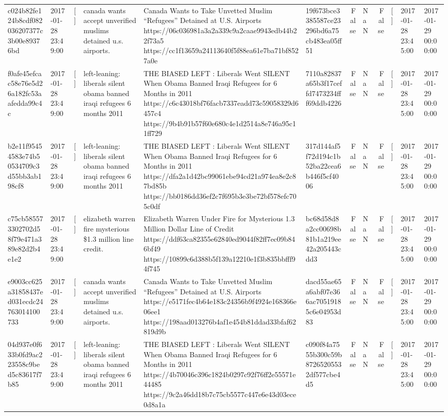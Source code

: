 \begin{tabular}{llllllrlrlll}
c024b82fe124b8cdf082036207377c3b00e89376bd & 2017-01-28 23:49:00 & [] & canada wants accept unverified muslims detained u.s. airports. & Canada Wants to Take Unvetted Muslim “Refugees” Detained at U.S. Airports https://06c036981a3a2a339c9a2caae9943edb44b22f73a5 https://cc1f13659a24113640f5f88ea61e7ba71bf8527a0e & 19f673bce3385587ce23296bd6a75cb483ea05ff51 & False & NaN & False & [] & 2017-01-28 23:45:00 & 2017-01-29 00:00:00 \\
f0afe45efcac58e76e5d26a182fc53aafedda99c4c & 2017-01-28 23:49:00 & [] & left-leaning: liberals silent obama banned iraqi refugees 6 months 2011 & THE BIASED LEFT : Liberals Went SILENT When Obama Banned Iraqi Refugees for 6 Months in 2011 https://c6c43018bf76facb7337eadd73c59058329d6457c4 https://9b4b91b57f60e680c4e1d2514a8e746a95c11ff729 & 7110a82837a65b3f17ceffd7473234fff69ddb4226 & False & NaN & False & [] & 2017-01-28 23:45:00 & 2017-01-29 00:00:00 \\
b2e11f95454583e74b50534709c3d55bb3ab198cf8 & 2017-01-28 23:49:00 & [] & left-leaning: liberals silent obama banned iraqi refugees 6 months 2011 & THE BIASED LEFT : Liberals Went SILENT When Obama Banned Iraqi Refugees for 6 Months in 2011 https://dfa2a1d42bc99061ebe94cd21a974ea8e2c87bd85b https://bb0186dd36ef2c7f695b3e3be72bf578efc705c0df & 317d144af5f72d194c1b52ba22cea6b446f5cf4006 & False & NaN & False & [] & 2017-01-28 23:45:00 & 2017-01-29 00:00:00 \\
c75cb585573302702d58f79e471a389e82d2b4e1e2 & 2017-01-28 23:49:00 & [] & elizabeth warren fire mysterious \$1.3 million line credit. & Elizabeth Warren Under Fire for Mysterious 1.3 Million Dollar Line of Credit https://ddf63ca82355e62840ed9044f82ff7ec09b846bf49 https://10899c6d388b5f139a12210e1f3b835bbfff94f745 & bc68d58d8a2cc00698b81b1a219ee42a205443cdd3 & False & NaN & False & [] & 2017-01-28 23:45:00 & 2017-01-29 00:00:00 \\
e9003cc625a31858437ed031ecdc24763014100733 & 2017-01-28 23:49:00 & [] & canada wants accept unverified muslims detained u.s. airports. & Canada Wants to Take Unvetted Muslim “Refugees” Detained at U.S. Airports https://e5171fec4b64e183c24356b9f4924e168366e06ee1 https://198aad013276b4af1e454b81ddad33bfaf62819d9b & dacd55ae65a6abf07e366ac70519185c6e04953d83 & False & NaN & False & [] & 2017-01-28 23:45:00 & 2017-01-29 00:00:00 \\
04d937e0f633b0fd9ac223558c9bed5c83617f7b85 & 2017-01-28 23:49:00 & [] & left-leaning: liberals silent obama banned iraqi refugees 6 months 2011 & THE BIASED LEFT : Liberals Went SILENT When Obama Banned Iraqi Refugees for 6 Months in 2011 https://4b70046c396c1824b0297c92f76ff2e55571e44485 https://9c2a46dd18b7c75cb5577c447e6e43d03ece0d8a1a & c090f84a7555b300c59b87265205532df577cbe4d5 & False & NaN & False & [] & 2017-01-28 23:45:00 & 2017-01-29 00:00:00 \\

\end{tabular}
